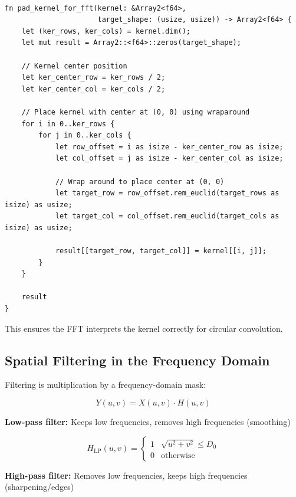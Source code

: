 \begin{lstlisting}[caption={Padding kernel with centre at origin for FFT}]

fn pad_kernel_for_fft(kernel: &Array2<f64>,
                      target_shape: (usize, usize)) -> Array2<f64> {
    let (ker_rows, ker_cols) = kernel.dim();
    let mut result = Array2::<f64>::zeros(target_shape);

    // Kernel center position
    let ker_center_row = ker_rows / 2;
    let ker_center_col = ker_cols / 2;

    // Place kernel with center at (0, 0) using wraparound
    for i in 0..ker_rows {
        for j in 0..ker_cols {
            let row_offset = i as isize - ker_center_row as isize;
            let col_offset = j as isize - ker_center_col as isize;

            // Wrap around to place center at (0, 0)
            let target_row = row_offset.rem_euclid(target_rows as isize) as usize;
            let target_col = col_offset.rem_euclid(target_cols as isize) as usize;

            result[[target_row, target_col]] = kernel[[i, j]];
        }
    }

    result
}
\end{lstlisting}

This ensures the FFT interprets the kernel correctly for circular convolution.

\subsection{Spatial Filtering in the Frequency Domain}

Filtering is multiplication by a frequency-domain mask:

\begin{equation}
  Y(u, v) = X(u, v) \cdot H(u, v)
\end{equation}

\textbf{Low-pass filter:} Keeps low frequencies, removes high
frequencies (smoothing)

\begin{equation}
  H_{\text{LP}}(u, v) =
  \begin{cases}
    1 & \sqrt{u^2 + v^2} \leq D_0 \\
    0 & \text{otherwise}
  \end{cases}
\end{equation}

\textbf{High-pass filter:} Removes low frequencies, keeps high
frequencies (sharpening/edges)

